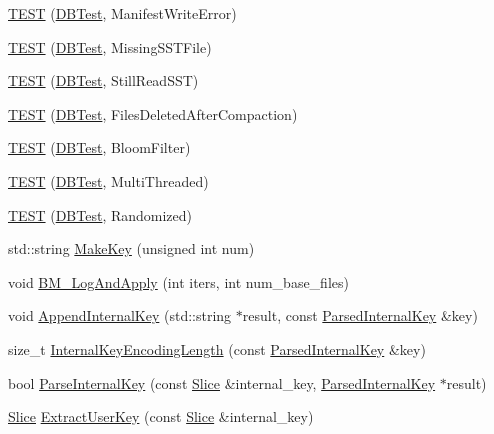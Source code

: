 \begin{DoxyCompactItemize}
\hyperlink{namespaceleveldb_a071c4940c40a4eed0d3e4e4044a227a6}{T\+E\+S\+T} (\hyperlink{classleveldb_1_1_d_b_test}{D\+B\+Test}, Manifest\+Write\+Error)
\item 
\hyperlink{namespaceleveldb_a8e750f4502e214132281fd755d26c175}{T\+E\+S\+T} (\hyperlink{classleveldb_1_1_d_b_test}{D\+B\+Test}, Missing\+S\+S\+T\+File)
\item 
\hyperlink{namespaceleveldb_ab4a8284a6c982c710e6e84af0d6040a9}{T\+E\+S\+T} (\hyperlink{classleveldb_1_1_d_b_test}{D\+B\+Test}, Still\+Read\+S\+S\+T)
\item 
\hyperlink{namespaceleveldb_a47755684dc15db851e0174ea9475e97c}{T\+E\+S\+T} (\hyperlink{classleveldb_1_1_d_b_test}{D\+B\+Test}, Files\+Deleted\+After\+Compaction)
\item 
\hyperlink{namespaceleveldb_a6d54978f51e046c170696cbb320f23f1}{T\+E\+S\+T} (\hyperlink{classleveldb_1_1_d_b_test}{D\+B\+Test}, Bloom\+Filter)
\item 
\hyperlink{namespaceleveldb_a9bee47c386abe6004d884f2552bd8184}{T\+E\+S\+T} (\hyperlink{classleveldb_1_1_d_b_test}{D\+B\+Test}, Multi\+Threaded)
\item 
\hyperlink{namespaceleveldb_a028ed215c12e1998d7073b18fce4c24c}{T\+E\+S\+T} (\hyperlink{classleveldb_1_1_d_b_test}{D\+B\+Test}, Randomized)
\item 
std\+::string \hyperlink{namespaceleveldb_a706c78e756ff2dcd2185cdf2265c0b8a}{Make\+Key} (unsigned int num)
\item 
void \hyperlink{namespaceleveldb_af9cf6ec167c9b6f25fd050ab6fb67a90}{B\+M\+\_\+\+Log\+And\+Apply} (int iters, int num\+\_\+base\+\_\+files)
\item 
void \hyperlink{namespaceleveldb_a7192bb79e7fa6ba01490473941386534}{Append\+Internal\+Key} (std\+::string $\ast$result, const \hyperlink{structleveldb_1_1_parsed_internal_key}{Parsed\+Internal\+Key} \&key)
\item 
size\+\_\+t \hyperlink{namespaceleveldb_a8406e76939e7e97465acf293f1585581}{Internal\+Key\+Encoding\+Length} (const \hyperlink{structleveldb_1_1_parsed_internal_key}{Parsed\+Internal\+Key} \&key)
\item 
bool \hyperlink{namespaceleveldb_a5a173b622e86c7a2f9beae3ac8818ac3}{Parse\+Internal\+Key} (const \hyperlink{classleveldb_1_1_slice}{Slice} \&internal\+\_\+key, \hyperlink{structleveldb_1_1_parsed_internal_key}{Parsed\+Internal\+Key} $\ast$result)
\item 
\hyperlink{classleveldb_1_1_slice}{Slice} \hyperlink{namespaceleveldb_a1c889869840312393b805ad91a41b94f}{Extract\+User\+Key} (const \hyperlink{classleveldb_1_1_slice}{Slice} \&internal\+\_\+key)

\end{DoxyCompactItemize}
